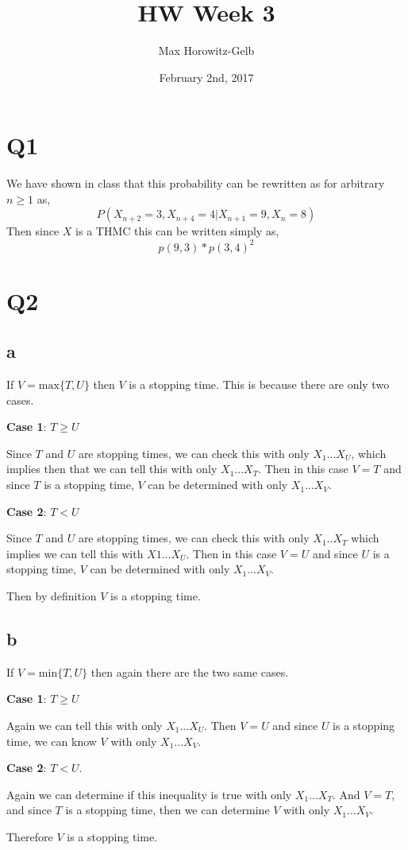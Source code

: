 \documentclass{article}
\title{HW Week 3}
\author{Max Horowitz-Gelb}
\date{February 2nd, 2017}
\begin{document}
\maketitle
\section*{Q1}
We have shown in class that this probability can be rewritten as for arbitrary $n \geq 1$ as, 
\[
P(X_{n+2} = 3, X_{n+4} = 4 | X_{n+1} = 9 , X_n = 8)
\]
Then since $X$ is a THMC this can be written simply as,
\[
p(9,3)*p(3,4)^2
\]

\section*{Q2}
\subsection*{a}
If $V = \text{max} \{T,U\}$ then $V$ is a stopping time. This is because there are only two cases.

\textbf{Case 1}: $T \geq U$

Since $T$ and $U$ are stopping times, we can check this with only $X_1 ... X_U$, which implies then that we can tell this with only $X_1 ... X_T$. Then in this case $V = T$ and since $T$ is a stopping time, $V$ can be determined with only $X_1 ... X_{V}$.

\textbf{Case 2}: $T < U$

Since $T$ and $U$ are stopping times, we can check this with only $X_1 .. X_T$ which implies we can tell this with $X1 ... X_U$. Then in this case $V = U$ and since $U$ is a stopping time, $V$ can be determined with only $X_1 ... X_{V}$.

Then by definition $V$ is a stopping time. 
\subsection*{b}
If $V = \text{min}\{T, U\}$ then again there are the two same cases.

\textbf{Case 1}: $T \geq U$

Again we can tell this with only $X_1 ... X_U$. Then $V = U$ and since $U$ is a stopping time, we can know $V$ with only $X_1 ... X_V$.

\textbf{Case 2}: $T < U$.

Again we can determine if this inequality is true with only $X_1 ... X_T$. And $V = T$, and since $T$ is a stopping time, then we can determine $V$ with only $X_1 ... X_V$.

Therefore $V$ is a stopping time.
\end{document}
